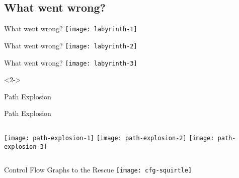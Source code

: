 \documentclass[xcolor={dvipsnames}]{beamer}
\begin{document}
\subsection{What went wrong?}
\begin{frame}{What went wrong?}
    \centering
    \texttt{[image: labyrinth-1]}
\end{frame}
\begin{frame}{What went wrong?}
    \centering
    \texttt{[image: labyrinth-2]}
\end{frame}
\begin{frame}{What went wrong?}
    \centering
    \texttt{[image: labyrinth-3]}
    \begin{uncoverenv}<2->
    \end{uncoverenv}
\end{frame}
\begin{frame}{Path Explosion}
\end{frame}
\begin{frame}{Path Explosion}
    \begin{columns}
        \texttt{[image: path-explosion-1]}
        \column<2->{0.4\textwidth}
        \texttt{[image: path-explosion-2]}
        \column<3->{0.4\textwidth}
        \texttt{[image: path-explosion-3]}
    \end{columns}
\end{frame}
\begin{frame}{Control Flow Graphs to the Rescue}
    \centering
    \texttt{[image: cfg-squirtle]}
\end{frame}
\end{document}
